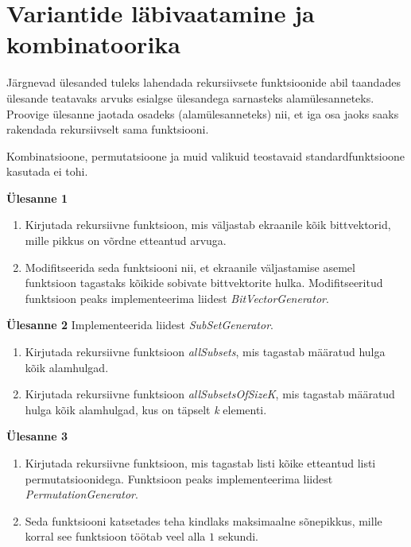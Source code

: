 \documentclass[a4paper]{article}
\begin{document}
\section*{Variantide läbivaatamine ja kombinatoorika}

Järgnevad ülesanded tuleks lahendada rekursiivsete funktsioonide abil
taandades ülesande teatavaks arvuks esialgse ülesandega sarnasteks
alamülesanneteks. Proovige ülesanne jaotada osadeks (alamülesanneteks)
nii, et iga osa jaoks saaks rakendada rekursiivselt sama funktsiooni.

Kombinatsioone, permutatsioone ja muid valikuid teostavaid standardfunktsioone kasutada ei tohi.

\begin{problem}
\textbf{Ülesanne 1}
\begin{enumerate}
\item 
Kirjutada rekursiivne funktsioon, mis väljastab ekraanile kõik
bittvektorid, mille pikkus on võrdne etteantud arvuga.
\item
Modifitseerida seda funktsiooni nii, et ekraanile väljastamise asemel funktsioon tagastaks kõikide sobivate bittvektorite hulka. Modifitseeritud funktsioon peaks implementeerima liidest \textit{BitVectorGenerator}.
\end{enumerate}
\end{problem}

\begin{problem}
\textbf{Ülesanne 2}
\newline
Implementeerida liidest \textit{SubSetGenerator}.
\begin{enumerate}
\item
Kirjutada rekursiivne funktsioon \textit{allSubsets}, mis tagastab määratud hulga kõik alamhulgad.
\item
Kirjutada rekursiivne funktsioon \textit{allSubsetsOfSizeK}, mis tagastab määratud hulga kõik alamhulgad, kus on täpselt \textit{k} elementi.
\end{enumerate}
\end{problem}

\begin{problem}
\textbf{Ülesanne 3}
\begin{enumerate}
\item
Kirjutada rekursiivne funktsioon, mis tagastab listi kõike etteantud listi permutatsioonidega.
Funktsioon peaks implementeerima liidest \textit{PermutationGenerator}.
\item
Seda funktsiooni katsetades teha kindlaks maksimaalne sõnepikkus, mille korral see funktsioon töötab veel alla $1$
sekundi.
\end{enumerate}
\end{problem}
\end{document}
